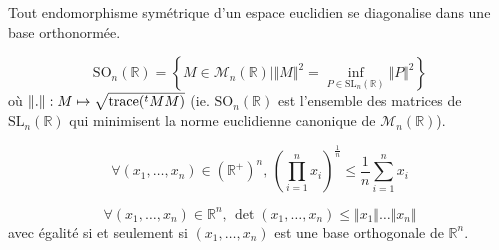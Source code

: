	\begin{application}
		Tout endomorphisme symétrique d'un espace euclidien se diagonalise dans une base orthonormée.
	\end{application}
	
	
	\begin{application}
		\[ \mathrm{SO}_n(\mathbb{R}) = \left\{ M \in \mathcal{M}_n(\mathbb{R}) \mid \Vert M \Vert^2 = \inf_{P \in \mathrm{SL}_n(\mathbb{R})} \Vert P \Vert^2 \right\} \]
		où $\Vert . \Vert : M \mapsto \sqrt{\operatorname{trace}(\mathstrut ^t MM)}$ (ie. $\mathrm{SO}_n(\mathbb{R})$ est l'ensemble des matrices de $\mathrm{SL}_n(\mathbb{R})$ qui minimisent la norme euclidienne canonique de $\mathcal{M}_n(\mathbb{R})$).
	\end{application}
	
	
	\begin{application}
		\[ \forall (x_1, \dots, x_n) \in (\mathbb{R}^+)^n, \, \left( \prod_{i=1}^{n} x_i \right)^{\frac{1}{n}} \leq \frac{1}{n} \sum_{i=1}^n x_i \]
	\end{application}
	
	
	\begin{application}
		\[ \forall (x_1, \dots, x_n) \in \mathbb{R}^n, \, \det(x_1, \dots, x_n) \leq \Vert x_1 \Vert \dots \Vert x_n \Vert \]
		avec égalité si et seulement si $(x_1, \dots, x_n)$ est une base orthogonale de $\mathbb{R}^n$.
	\end{application}

